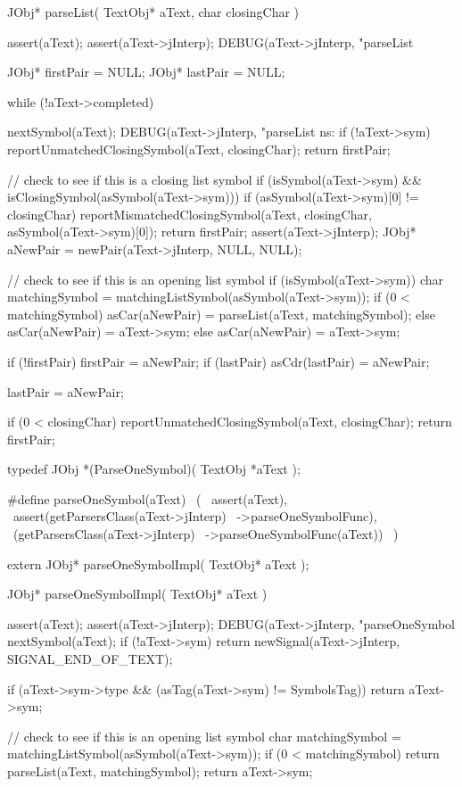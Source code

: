 \startCCode
JObj* parseList(
  TextObj* aText,
  char closingChar
) {
  assert(aText);
  assert(aText->jInterp);
  DEBUG(aText->jInterp,
    "parseList %

  JObj* firstPair = NULL;
  JObj* lastPair  = NULL;

  while (!aText->completed) {

    nextSymbol(aText);
    DEBUG(aText->jInterp,
      "parseList ns: %
    if (!aText->sym) {
      reportUnmatchedClosingSymbol(aText, closingChar);
      return firstPair;
    }

    // check to see if this is a closing list symbol
    if (isSymbol(aText->sym) &&
        isClosingSymbol(asSymbol(aText->sym))) {
      if (asSymbol(aText->sym)[0] != closingChar) {
        reportMismatchedClosingSymbol(aText, closingChar,
                                      asSymbol(aText->sym)[0]);
      }
      return firstPair;
    }
    assert(aText->jInterp);
    JObj* aNewPair = newPair(aText->jInterp, NULL, NULL);

    // check to see if this is an opening list symbol
    if (isSymbol(aText->sym)) {
      char matchingSymbol = matchingListSymbol(asSymbol(aText->sym));
      if (0 < matchingSymbol) {
        asCar(aNewPair) = parseList(aText, matchingSymbol);
      } else asCar(aNewPair) = aText->sym;
    } else asCar(aNewPair) = aText->sym;

    if (!firstPair) firstPair       = aNewPair;
    if (lastPair)   asCdr(lastPair) = aNewPair;

    lastPair = aNewPair;
  }

  if (0 < closingChar) reportUnmatchedClosingSymbol(aText, closingChar);
  return firstPair;
}
\stopCCode


\startCHeader
typedef JObj *(ParseOneSymbol)(
  TextObj *aText
);

#define parseOneSymbol(aText)               \
  (                                         \
    assert(aText),                          \
    assert(getParsersClass(aText->jInterp)  \
      ->parseOneSymbolFunc),                \
    (getParsersClass(aText->jInterp)        \
      ->parseOneSymbolFunc(aText))          \
  )
\stopCHeader

\setCHeaderStream{private}
\startCHeader
extern JObj* parseOneSymbolImpl(
  TextObj* aText
);
\stopCHeader
{}

\startCCode
JObj* parseOneSymbolImpl(
  TextObj* aText
) {
  assert(aText);
  assert(aText->jInterp);
  DEBUG(aText->jInterp, "parseOneSymbol %
  nextSymbol(aText);
  if (!aText->sym) {
    return newSignal(aText->jInterp, SIGNAL_END_OF_TEXT);
  }

  if (aText->sym->type &&
     (asTag(aText->sym) != SymbolsTag)) return aText->sym;

  // check to see if this is an opening list symbol
  char matchingSymbol = matchingListSymbol(asSymbol(aText->sym));
  if (0 < matchingSymbol) {
    return parseList(aText, matchingSymbol);
  }
  return aText->sym;
}
\stopCCode

